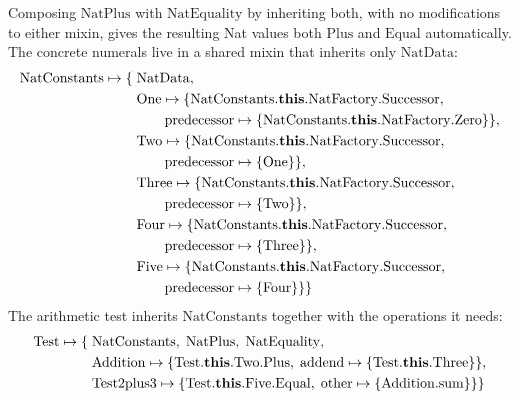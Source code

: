 Composing $\mathrm{NatPlus}$ with $\mathrm{NatEquality}$ by
inheriting both, with no modifications to either mixin, gives the
resulting Nat values both $\mathrm{Plus}$ and $\mathrm{Equal}$
automatically.
The concrete numerals live in a shared mixin that inherits only $\mathrm{NatData}$:
\begin{align*}
  \mathrm{NatConstants} \mapsto \{\;&
    \mathrm{NatData},\\
    &\mathrm{One} \mapsto \{
      \mathrm{NatConstants}.\mathbf{this}.\mathrm{NatFactory}.\mathrm{Successor},\\
      &\quad\quad
      \mathrm{predecessor} \mapsto \{
    \mathrm{NatConstants}.\mathbf{this}.\mathrm{NatFactory}.\mathrm{Zero}\}\},\\
    &\mathrm{Two} \mapsto \{
      \mathrm{NatConstants}.\mathbf{this}.\mathrm{NatFactory}.\mathrm{Successor},\\
      &\quad\quad
    \mathrm{predecessor} \mapsto \{\mathrm{One}\}\},\\
    &\mathrm{Three} \mapsto \{
      \mathrm{NatConstants}.\mathbf{this}.\mathrm{NatFactory}.\mathrm{Successor},\\
      &\quad\quad
    \mathrm{predecessor} \mapsto \{\mathrm{Two}\}\},\\
    &\mathrm{Four} \mapsto \{
      \mathrm{NatConstants}.\mathbf{this}.\mathrm{NatFactory}.\mathrm{Successor},\\
      &\quad\quad
    \mathrm{predecessor} \mapsto \{\mathrm{Three}\}\},\\
    &\mathrm{Five} \mapsto \{
      \mathrm{NatConstants}.\mathbf{this}.\mathrm{NatFactory}.\mathrm{Successor},\\
      &\quad\quad
  \mathrm{predecessor} \mapsto \{\mathrm{Four}\}\}\}
\end{align*}
The arithmetic test inherits $\mathrm{NatConstants}$ together with the operations it needs:
\begin{align*}
  \mathrm{Test} \mapsto \{\;&
    \mathrm{NatConstants},\; \mathrm{NatPlus},\; \mathrm{NatEquality},\\
    &\mathrm{Addition} \mapsto \{
      \mathrm{Test}.\mathbf{this}.\mathrm{Two}.\mathrm{Plus},\;
    \mathrm{addend} \mapsto \{\mathrm{Test}.\mathbf{this}.\mathrm{Three}\}\},\\
    &\mathrm{Test2plus3} \mapsto \{
      \mathrm{Test}.\mathbf{this}.\mathrm{Five}.\mathrm{Equal},\;
  \mathrm{other} \mapsto \{\mathrm{Addition}.\mathrm{sum}\}\}\}
\end{align*}
